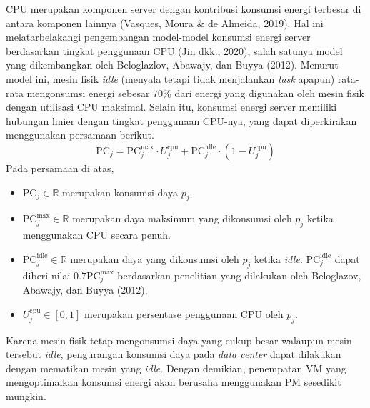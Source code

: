 CPU merupakan komponen server dengan kontribusi konsumsi energi terbesar di antara komponen lainnya (Vasques, Moura \& de Almeida, 2019). Hal ini melatarbelakangi pengembangan model-model konsumsi energi server berdasarkan tingkat penggunaan CPU (Jin dkk., 2020), salah satunya model yang dikembangkan oleh Beloglazlov, Abawajy, dan Buyya (2012). Menurut model ini, mesin fisik \textit{idle} (menyala tetapi tidak menjalankan \textit{task} apapun) rata-rata mengonsumsi energi sebesar 70\% dari energi yang digunakan oleh mesin fisik dengan utilisasi CPU maksimal. Selain itu, konsumsi energi server memiliki hubungan linier dengan tingkat penggunaan CPU-nya, yang dapat diperkirakan menggunakan persamaan berikut.
\[
\text{PC}_j=\text{PC}_j^{\max} \cdot U_j^\text{cpu} +\text{PC}_j^\text{idle} \cdot (1- U_j^\text{cpu})
\]
Pada persamaan di atas,
\begin{itemize}
  \item {$\text{PC}_j \in \mathbb{R}$ merupakan konsumsi daya $p_j$.}
  \item {$\text{PC}_j^\text{max} \in \mathbb{R}$ merupakan daya maksimum yang dikonsumsi oleh $p_j$ ketika menggunakan CPU secara penuh.}
  \item {$\text{PC}_j^\text{idle} \in \mathbb{R}$ merupakan daya yang dikonsumsi oleh $p_j$ ketika \textit{idle}. $\text{PC}_j^\text{idle}$ dapat diberi nilai $0.7\text{PC}_j^\max$ berdasarkan penelitian yang dilakukan oleh Beloglazov, Abawajy, dan Buyya (2012).}
  \item {$U_j^\text{cpu} \in [0,1]$ merupakan persentase penggunaan CPU oleh $p_j$.}   
\end{itemize}

Karena mesin fisik tetap mengonsumsi daya yang cukup besar walaupun mesin tersebut \textit{idle}, pengurangan konsumsi daya pada \textit{data center} dapat dilakukan dengan mematikan mesin yang \textit{idle}. Dengan demikian, penempatan VM yang mengoptimalkan konsumsi energi akan berusaha menggunakan PM sesedikit mungkin.
